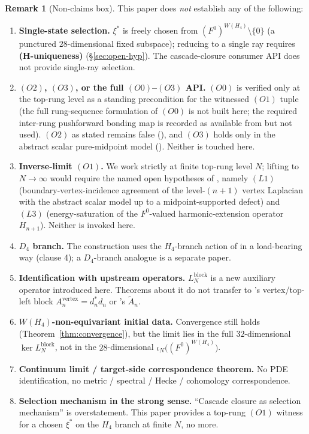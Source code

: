 \documentclass[11pt]{article}
\theoremstyle{definition}
\newtheorem{remark}[theorem]{Remark}
\begin{document}
\begin{remark}[Non-claims box]
\label{rmk:non-claims}
This paper does \emph{not} establish any of the following:
\begin{enumerate}[label=(\roman*), leftmargin=2em]
\item \textbf{Single-state selection.} $\xi^{*}$ is freely chosen
  from $(F^0)^{W(H_4)} \setminus \{0\}$ (a punctured $28$-dimensional fixed subspace);
  reducing to a single ray requires \textbf{(H-uniqueness)}
  (\S\ref{sec:open-hyp}). The cascade-closure consumer API does
  not provide single-ray selection.
\item \textbf{$(O2)$, $(O3)$, or the full $(O0)$--$(O3)$ API.}
  $(O0)$ is verified only at the top-rung level as a standing
  precondition for the witnessed $(O1)$ tuple (the full
  rung-sequence formulation of $(O0)$ is not built here; the
  required inter-rung pushforward bonding map is recorded as
  available from
  \cite[Definition~\texttt{def:p0}, Theorem~\texttt{thm:bonding}]
  {RefinementSpaces} but not used). $(O2)$ as stated remains false
  (\cite[Proposition~\texttt{prop:strict-fails}]{RefinementCompat}),
  and $(O3)$ holds only in the abstract scalar pure-midpoint
  model
  (\cite[Theorem~\texttt{thm:O3-discharge}]{RefinementCompat}).
  Neither is touched here.
\item \textbf{Inverse-limit $(O1)$.} We work strictly at finite
  top-rung level $N$; lifting to $N \to \infty$ would require
  the named open hypotheses of
  \cite[\S\texttt{sec:scope-and-gap}]{RefinementCompat}, namely
  $(L1)$ (boundary-vertex-incidence agreement of the level-$(n+1)$
  vertex Laplacian with the abstract scalar model up to a
  midpoint-supported defect) and $(L3)$ (energy-saturation of the
  $F^{0}$-valued harmonic-extension operator $H_{n+1}$). Neither is
  invoked here.
\item \textbf{$D_4$ branch.} The construction uses the
  $H_4$-branch action of \cite[Definition~\texttt{def:coxeter}]{RefinementSpaces}
  in a load-bearing way (clause 4); a $D_4$-branch analogue is
  a separate paper.
\item \textbf{Identification with upstream operators.}
  $L_N^{\mathrm{block}}$ is a new auxiliary operator introduced
  here. Theorems about it do not transfer to
  \cite{ClosureDynamics}'s vertex/top-left block
  $A_n^{\mathrm{vertex}} = d_n^{*} d_n$ or
  \cite{RefinementCompat}'s $\widetilde A_n$.
\item \textbf{$W(H_4)$-non-equivariant initial data.}
  Convergence still holds (Theorem~\ref{thm:convergence}), but
  the limit lies in the full $32$-dimensional
  $\ker L_N^{\mathrm{block}}$, not in the $28$-dimensional
  $\iota_N\bigl((F^0)^{W(H_4)}\bigr)$.
\item \textbf{Continuum limit / target-side correspondence
  theorem.} No PDE identification, no metric / spectral / Hecke
  / cohomology correspondence.
\item \textbf{Selection mechanism in the strong sense.}
  ``Cascade closure as selection mechanism'' is overstatement.
  This paper provides a top-rung $(O1)$ witness for a chosen
  $\xi^{*}$ on the $H_4$ branch at finite $N$, no more.
\end{enumerate}
\end{remark}
\end{document}
